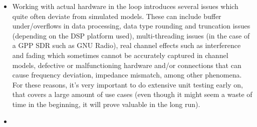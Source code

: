 \begin{itemize}
  \item Working with actual hardware in the loop introduces several issues which quite often deviate from simulated models. These can include buffer under/overflows in data processing, data type rounding and truncation issues (depending on the DSP platform used), multi-threading issues (in the case of a GPP SDR such as GNU Radio), real channel effects such as interference and fading which sometimes cannot be accurately captured in channel models, defective or malfunctioning hardware and/or connections that can cause frequency deviation, impedance mismatch, among other phenomena. For these reasons, it's very important to do extensive unit testing early on, that covers a large amount of use cases (even though it might seem a waste of time in the beginning, it will prove valuable in the long run).
  \item
\end{itemize}

